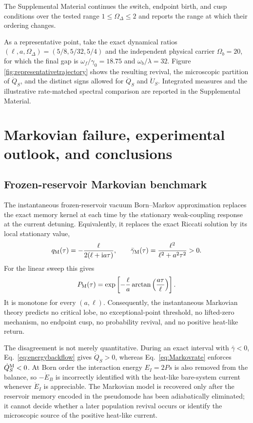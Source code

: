 \documentclass[reprint,superscriptaddress,floatfix,amsmath,amssymb,prresearch,aps]{revtex4-2}
\newcommand{\ii}{\mathrm{i}}
\begin{document}
The Supplemental Material continues the switch, endpoint birth, and cusp conditions over the tested range $1\leq\Omega_\Delta\leq2$ and reports the range at which their ordering changes.

As a representative point, take the exact dynamical ratios
\((\ell,a,\Omega_\Delta)=(5/8,5/32,5/4)\) and the independent physical
carrier \(\Omega_b=20\), for which the final gap is
\(\omega_f/\gamma_0=18.75\) and \(\omega_b/\lambda=32\). Figure
\ref{fig:representativetrajectory} shows the resulting revival, the microscopic
partition of \(\dot Q_S\), and the distinct signs allowed for \(\dot Q_S\) and
\(\dot U_S\). Integrated measures and the illustrative rate-matched spectral
comparison are reported in the Supplemental Material.

\clearpage
\section{Markovian failure, experimental outlook, and conclusions}
\label{sec:Markovian}

\subsection{Frozen-reservoir Markovian benchmark}

The instantaneous frozen-reservoir vacuum Born--Markov approximation replaces
the exact memory kernel at each time by the stationary weak-coupling response
at the current detuning. Equivalently, it replaces the exact Riccati solution
by its local stationary value,
\begin{equation}
q_{\rm M}(\tau)=-\frac{\ell}{2(\ell+\ii a\tau)},
\qquad
\bar\gamma_{\rm M}(\tau)=\frac{\ell^2}{\ell^2+a^2\tau^2}>0.
\label{eq:Markovrate}
\end{equation}
For the linear sweep this gives
\begin{equation}
P_{\rm M}(\tau)=
\exp\left[-\frac{\ell}{a}
\arctan\left(\frac{a\tau}{\ell}\right)\right].
\label{eq:Markovpopulation}
\end{equation}
It is monotone for every \((a,\ell)\). Consequently, the instantaneous
Markovian theory predicts no critical lobe, no exceptional-point threshold,
no lifted-zero mechanism, no endpoint cusp, no probability revival, and no
positive heat-like return.

The disagreement is not merely quantitative. During an exact interval with
\(\bar\gamma<0\), Eq.~\eqref{eq:energybackflow} gives
\(\dot Q_S>0\), whereas Eq.~\eqref{eq:Markovrate} enforces
\(\dot Q_S^{\rm M}<0\). At Born order the interaction energy
\(E_I=2Ps\) is also removed from the balance, so \(-\dot E_B\) is
incorrectly identified with the heat-like bare-system current whenever
\(\dot E_I\) is appreciable. The Markovian model is recovered only after the
reservoir memory encoded in the pseudomode has been adiabatically eliminated;
it cannot decide whether a later population revival occurs or identify the
microscopic source of the positive heat-like current.
\end{document}
